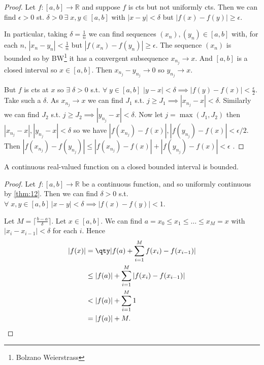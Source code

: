 \begin{proof}
    Let $f: [a, b] \to \mathbb{R}$ and suppose $f$ is cts but not uniformly cts. Then we can find $\epsilon > 0$ st. $\delta > 0 \ \exists \; x,y \in [a, b]$ with $|x-y| < \delta$ but $|f(x) - f(y)| \geq \epsilon$.

    In particular, taking $\delta = \frac{1}{n}$ we can find sequences $(x_n), (y_n) \in [a, b]$ with, for each $n$, $|x_n - y_n| < \frac{1}{n}$ but $|f(x_n) - f(y_n)| \geq \epsilon$.
    The sequence $(x_n)$ is bounded so by BW\footnote{Bolzano Weierstrass} it has a convergent subsequence $x_{n_j} \to x$.
    And $[a, b]$ is a closed interval so $x \in [a, b]$.
    Then $x_{n_j} - y_{n_j} \to 0$ so $y_{n_j} \to x$.

    But $f$ is cts at $x$ so $\exists \; \delta > 0$ s.t. $\forall \; y \in [a, b]$ $|y-x| < \delta \implies |f(y) - f(x)| < \frac{\epsilon}{2}$. 
    Take such a $\delta$.
    As $x_{n_j} \to x$ we can find $J_1$ s.t. $j \geq J_1 \implies |x_{n_j} - x| < \delta$.
    Similarly we can find $J_2$ s.t. $j \geq J_2 \implies |y_{n_j} - x| < \delta$.
    Now let $j = \max (J_1, J_2)$ then $|x_{n_j} - x|, |y_{n_j} - x| < \delta$ so we have $|f(x_{n_j}) - f(x)|, |f(y_{n_j}) - f(x)| < \epsilon / 2$.
    Then $|f(x_{n_j}) - f(y_{n_j})| \leq |f(x_{n_j}) - f(x)| + |f(y_{n_j}) - f(x)| < \epsilon$ \Lightning.
\end{proof} 

\begin{corollary} \label{cor:13}
    A continuous real-valued function on a closed bounded interval is bounded.
\end{corollary} 

\begin{proof}
    Let $f:[a, b] \to \mathbb{R}$ be a continuous function, and so uniformly continuous by \cref{thm:12}.
    Then we can find $\delta > 0$ s.t. $\forall \; x, y \in [a, b] \ |x - y| < \delta \implies |f(x) - f(y)| < 1$.

    Let $M = \lceil \frac{b - a}{\delta} \rceil$.
    Let $x \in [a, b]$.
    We can find $a = x_0 \leq x_1 \leq \dots \leq x_M = x$ with $|x_i - x_{i - 1}| < \delta$ for each $i$.
    Hence
    \begin{align*}
        |f(x)| &= \qty| f(a) + \sum_{i=1}^{M} f(x_i) - f(x_{i - 1}) |\\
        &\leq |f(a)| + \sum_{i=1}^{M} |f(x_i) - f(x_{i-1})| \\
        &< |f(a)| + \sum_{i=1}^{M} 1 \\
        &= |f(a)| + M.
    \end{align*} 
\end{proof}

